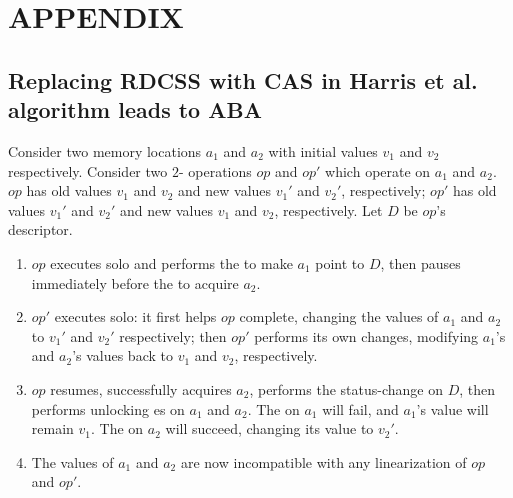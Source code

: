 \newpage
\section{APPENDIX}

\subsection{Replacing RDCSS with CAS in Harris et al. algorithm leads to ABA}\label{sec:aba-harris}

Consider two memory locations $a_1$ and $a_2$ with initial values $v_1$ and $v_2$ respectively. Consider two $2$-\cas{} operations $op$ and $op'$ which operate on $a_1$ and $a_2$. $op$ has old values $v_1$ and $v_2$ and new values $v_1'$ and $v_2'$, respectively; $op'$ has old values $v_1'$ and $v_2'$ and new values $v_1$ and $v_2$, respectively. Let $D$ be $op$'s descriptor.

\begin{enumerate}
    \item $op$ executes solo and performs the \cas{} to make $a_1$ point to $D$, then pauses immediately before the \cas{} to acquire $a_2$.
    \item $op'$ executes solo: it first helps $op$ complete, changing the values of $a_1$ and $a_2$ to $v_1'$ and $v_2'$ respectively; then $op'$ performs its own changes, modifying $a_1$'s and $a_2$'s values back to $v_1$ and $v_2$, respectively. 
    \item $op$ resumes, successfully acquires $a_2$, performs the status-change \cas{} on $D$, then performs unlocking \cas{}es on $a_1$ and $a_2$. The \cas{} on $a_1$ will fail, and $a_1$'s value will remain $v_1$. The \cas{} on $a_2$ will succeed, changing its value to $v_2'$.
    \item The values of $a_1$ and $a_2$ are now incompatible with any linearization of $op$ and $op'$.
\end{enumerate}

